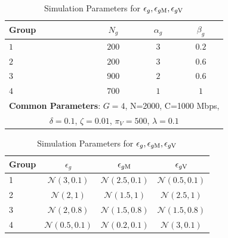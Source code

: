 \documentclass[12pt, draftclsnofoot, onecolumn]{IEEEtran}
\begin{document}
		\begin{table}[h!]
			\centering
			\begin{minipage}{0.4\textwidth}
				\centering
				\caption{User Groups and Model Parameters}
				\begin{tabular}{|l|c|c|c|}
					\hline
					\textbf{Group} & \( N_g \) & \( \alpha_g \) & \( \beta_g \) \\ 
					\hline
					$1$ & $200$ & $3$ & $0.2$ \\ 
					$2$ & $200$ & $3$ & $0.6$ \\ 
					$3$ & $900$ & $2$ & $0.6$ \\ 
					$4$ & $700$ & $1$ & $1$ \\ 
					\hline
					\multicolumn{4}{|c|}{\textbf{Common Parameters}: \( G=4 \), N=2000, C=1000 Mbps,} \\ 
					\multicolumn{4}{|c|}{\(\delta=0.1\), \(\zeta=0.01\), \(\pi_V=500\), \(\lambda=0.1\)} \\ 
					\hline
				\end{tabular}
				\label{tab:simulation_parameters}
			\end{minipage}%
			\hfill
			\begin{minipage}{0.45\textwidth}
				\centering
				\caption{Simulation Parameters for \(\epsilon_g, \epsilon_{g\rm M}, \epsilon_{g\rm V}\)}
				\begin{tabular}{|l|c|c|c|}
					\hline
					\textbf{Group} & \(\epsilon_g\) & \(\epsilon_{g\rm M}\) & \(\epsilon_{g\rm V}\) \\ 
					\hline
					1 & \(\mathcal{N}(3, 0.1)\) & \(\mathcal{N}(2.5, 0.1)\) & \(\mathcal{N}(0.5, 0.1)\) \\ 
					2 & \(\mathcal{N}(2, 1)\) & \(\mathcal{N}(1.5, 1)\) & \(\mathcal{N}(2.5, 1)\) \\ 
					3 & \(\mathcal{N}(2, 0.8)\) & \(\mathcal{N}(1.5, 0.8)\) & \(\mathcal{N}(1.5, 0.8)\) \\ 
					4 & \(\mathcal{N}(0.5, 0.1)\) & \(\mathcal{N}(0.2, 0.1)\) & \(\mathcal{N}(3, 0.1)\) \\ 
					\hline
				\end{tabular}
				\label{tab:compact_simulation_parameters}
			\end{minipage}
		\end{table}
		
		
\end{document}
